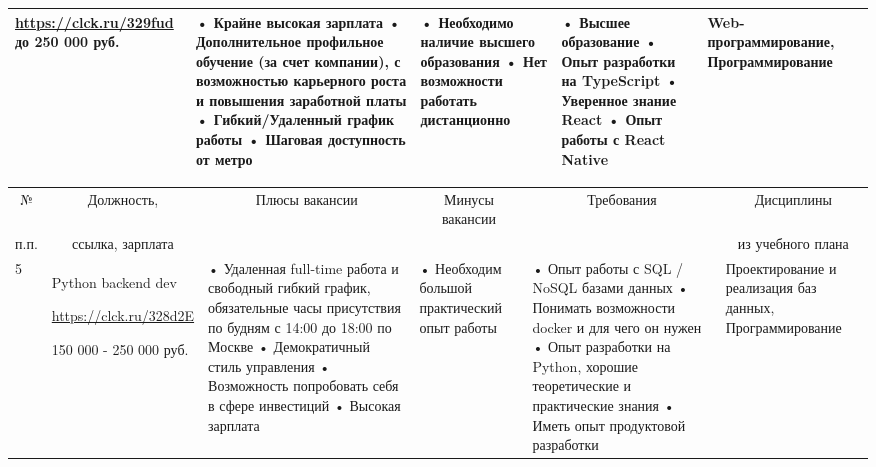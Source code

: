 \begin{landscape}
\begin{table}[H]
\begin{center}
\begin{small}
\begin{tabular}{|p{0.1cm}|p{5cm}|p{4.5cm}|p{4.5cm}|p{4cm}|p{3cm}|}
				\url{https://clck.ru/329fud}
				до 250 000 руб.
				&
				• Крайне высокая зарплата
				\newline• Дополнительное профильное обучение (за счет компании), с возможностью карьерного роста и повышения заработной платы
				\newline• Гибкий/Удаленный график работы
				\newline• Шаговая доступность от метро
				&
				• Необходимо наличие высшего образования
				\newline• Нет возможности работать дистанционно
				&
				• Высшее образование
				\newline• Опыт разработки на TypeScript
				\newline• Уверенное знание React
				\newline• Опыт работы с React Native
				&
				Web-программирование, Программирование
				\\
				\hline
			\end{tabular}
		\end{small}
	\end{center}
\end{table}

\begin{table}[H]
	\begin{center}
		\begin{small}
		\begin{tabular}{|p{0.1cm}|p{5cm}|p{4.5cm}|p{4.5cm}|p{4cm}|p{3cm}|} \hline
			\multicolumn{1}{|c|}{№}&\multicolumn{1}{c|}{Должность,}&\multicolumn{1}{c|}{Плюсы вакансии}&\multicolumn{1}{c|}{Минусы вакансии}&\multicolumn{1}{c|}{Требования}&\multicolumn{1}{c|}{Дисциплины}\\ 
			\multicolumn{1}{|c|}{п.п.}&\multicolumn{1}{c|}{ссылка, зарплата}&\multicolumn{1}{c|}{}&\multicolumn{1}{c|}{}&\multicolumn{1}{c|}{}&\multicolumn{1}{c|}{из учебного плана}\\ 
			\hline
				5 & Python backend dev
				
				\url{https://clck.ru/328d2E}
				
				150 000 - 250 000 руб. &
				• Удаленная full-time работа и свободный гибкий график, обязательные часы присутствия по будням с 14:00 до 18:00 по Москве
				\newline• Демократичный стиль управления
				\newline• Возможность попробовать себя в сфере инвестиций
				\newline• Высокая зарплата
				&
				• Необходим большой практический опыт работы
				&
				• Опыт работы с SQL / NoSQL базами данных
				\newline• Понимать возможности docker и для чего он нужен
				\newline• Опыт разработки на Python, хорошие теоретические и практические знания
				\newline• Иметь опыт продуктовой разработки
				&
				Проектирование и реализация баз данных, Программирование
				\\
				\hline
				

\end{tabular}
\end{small}
\end{center}
\end{table}
\end{landscape}
